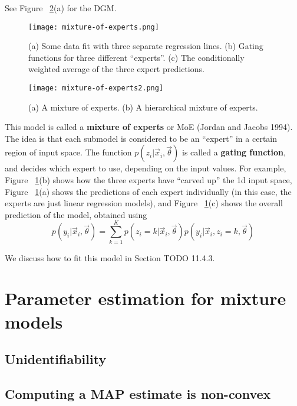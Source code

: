 See Figure ~\ref{fig:mixture-of-experts2}(a) for the DGM.

\begin{figure}[hbtp]
\centering
    \texttt{[image: mixture-of-experts.png]}
\caption{(a) Some data fit with three separate regression lines. (b) Gating functions for three different “experts”. (c) The conditionally weighted average of the three expert predictions.}
\label{fig:mixture-of-experts} 
\end{figure}

\begin{figure}[hbtp]
\centering
    \texttt{[image: mixture-of-experts2.png]}
\caption{(a) A mixture of experts. (b) A hierarchical mixture of experts.}
\label{fig:mixture-of-experts2} 
\end{figure}

This model is called a \textbf{mixture of experts} or MoE (Jordan and Jacobs 1994). The idea is that each submodel is considered to be an “expert” in a certain region of input space. The function $p(z_i | \vec{x}_i,\vec{\theta})$ is called a \textbf{gating function}, and decides which expert to use, depending on the input values. For example, Figure ~\ref{fig:mixture-of-experts}(b) shows how the three experts have “carved up” the 1d input space, Figure ~\ref{fig:mixture-of-experts}(a) shows the predictions of each expert individually (in this case, the experts are just linear regression models), and Figure ~\ref{fig:mixture-of-experts}(c) shows the overall prediction of the model, obtained using
\begin{equation}
p(y_i|\vec{x}_i,\vec{\theta})=\sum\limits_{k=1}^K p(z_i=k | \vec{x}_i,\vec{\theta})p(y_i|\vec{x}_i,z_i=k,\vec{\theta})
\end{equation}

We discuss how to fit this model in Section TODO 11.4.3.


\section{Parameter estimation for mixture models}


\subsection{Unidentifiability}


\subsection{Computing a MAP estimate is non-convex}



